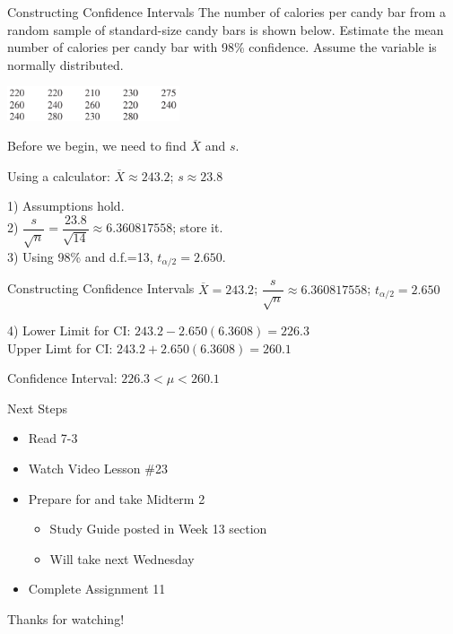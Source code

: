 \documentclass[t, aspectratio=169]{beamer}
\newcommand{\?}{\stackrel{?}{=}}
\begin{document}
	\begin{frame}{Constructing Confidence Intervals}
		The number of calories per candy bar from a random sample of standard-size candy bars is shown below. Estimate the mean number of calories per candy bar with 98\% confidence. Assume the variable is normally distributed.
		
		\includegraphics[width=2in]{candy-data.png} \pause
		
		Before we begin, we need to find $\overline{X}$ and $s$. \pause
		
		Using a calculator: $\overline{X} \approx 243.2$; $s \approx 23.8$ \pause
		
		1) Assumptions hold. \pause \\
		2) $\dfrac{s}{\sqrt{n}} = \dfrac{23.8}{\sqrt{14}} \approx 6.360817558$; store it. \pause \\
		3) Using 98\% and d.f.=13, $t_{\alpha/2} = 2.650$.
	\end{frame}

	\begin{frame}{Constructing Confidence Intervals}
		$\overline{X} = 243.2$; $\dfrac{s}{\sqrt{n}} \approx 6.360817558$; $t_{\alpha/2} = 2.650$ \pause
		
		4) Lower Limit for CI: $243.2 - 2.650(6.3608) = 226.3$ \pause \\
		Upper Limt for CI: $243.2 + 2.650(6.3608) = 260.1$ \pause
		
		Confidence Interval: $226.3 < \mu < 260.1$
	\end{frame}

	\begin{frame}{Next Steps}
		\begin{itemize}
			\item Read 7-3
			\item Watch Video Lesson \#23
			\item Prepare for and take Midterm 2 \begin{itemize}
				\item Study Guide posted in Week 13 section
				\item Will take next Wednesday
			\end{itemize}
			\item Complete Assignment 11
		\end{itemize}
	
		\vfill
		
		Thanks for watching!
	\end{frame}
	
\end{document}

